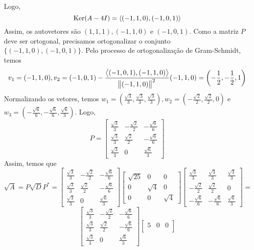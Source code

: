 \documentclass[11pt,a4paper]{article}
\begin{document}
{\[\]
Logo, 
\[
\operatorname{Ker}(A - 4I) = \langle (-1,1,0), (-1,0,1) \rangle
\]
Assim, os autovetores são $(1,1,1),(-1,1,0)$ e $(-1,0,1).$ Como a matriz $P$ deve ser ortogonal, precisamos ortogonalizar o conjunto $\{ (-1,1,0),(-1,0,1)\}.$ Pelo processo de ortogonalização de Gram-Schmidt, temos
\[
v_1 =  (-1,1,0), v_2 = (-1,0,1) - \frac{\left\langle (-1,0,1),(-1,1,0) \right\rangle}{\norm{(-1,1,0)}^2}(-1,1,0) = \left(- \frac{1}{2}, - \frac{1}{2}, 1  \right) 
\]
Normalizando os vetores, temos $w_1 = \left( \frac{\sqrt{3}}{3}, \frac{\sqrt{3}}{3}, \frac{\sqrt{3}}{3} \right), w_2 = \left( - \frac{\sqrt{2}}{2}, \frac{\sqrt{2}}{2}, 0 \right)$ e $w_3 = \left( - \frac{\sqrt{6}}{6}, - \frac{\sqrt{6}}{6},  \frac{\sqrt{6}}{3}  \right).$
Logo, 
\[
P = \begin{bmatrix}
 \frac{\sqrt{3}}{3} & - \frac{\sqrt{2}}{2} & - \frac{\sqrt{6}}{6} \\
 \frac{\sqrt{3}}{3} & \frac{\sqrt{2}}{2} & - \frac{\sqrt{6}}{6} \\
 \frac{\sqrt{3}}{3} & 0 &  \frac{\sqrt{6}}{3}  
\end{bmatrix}
\]
Assim, temos que
\[
\sqrt{A} = P\sqrt{D}P^{*} =  \begin{bmatrix}
 \frac{\sqrt{3}}{3} & - \frac{\sqrt{2}}{2} & - \frac{\sqrt{6}}{6} \\
 \frac{\sqrt{3}}{3} & \frac{\sqrt{2}}{2} & - \frac{\sqrt{6}}{6} \\
 \frac{\sqrt{3}}{3} & 0 &  \frac{\sqrt{6}}{3}  
\end{bmatrix}\begin{bmatrix}
\sqrt{25} & 0 & 0 \\
0 & \sqrt{4} & 0 \\
0 & 0 & \sqrt{4} 
\end{bmatrix}\begin{bmatrix}
 \frac{\sqrt{3}}{3} &  \frac{\sqrt{3}}{3}  &  \frac{\sqrt{3}}{3} \\
- \frac{\sqrt{2}}{2} &\frac{\sqrt{2}}{2} & 0 \\
- \frac{\sqrt{6}}{6} & - \frac{\sqrt{6}}{6}&  \frac{\sqrt{6}}{3}  
\end{bmatrix} = \]\[ \begin{bmatrix}
 \frac{\sqrt{3}}{3} & - \frac{\sqrt{2}}{2} & - \frac{\sqrt{6}}{6} \\
 \frac{\sqrt{3}}{3} & \frac{\sqrt{2}}{2} & - \frac{\sqrt{6}}{6} \\
 \frac{\sqrt{3}}{3} & 0 &  \frac{\sqrt{6}}{3}  
\end{bmatrix}\begin{bmatrix}
5 & 0 & 0 \\

\end{bmatrix}\]}
\end{document}
